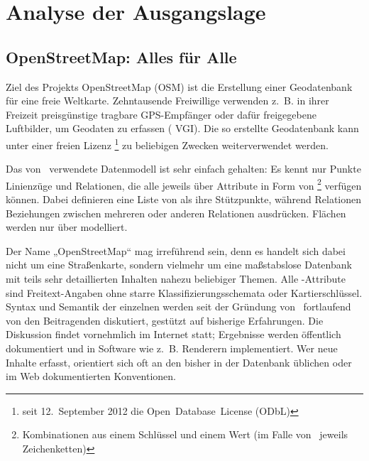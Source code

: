 \documentclass[../main/thesis.tex]{subfiles}
\begin{document}
\chapter{Analyse der Ausgangslage}

\section{OpenStreetMap: Alles für Alle}
\label{ch:osm-intro}

Ziel des Projekts OpenStreetMap (OSM) ist die Erstellung einer Geodatenbank für eine freie Weltkarte. 
Zehntausende Freiwillige verwenden z.~B. in ihrer Freizeit preisgünstige tragbare GPS-Empfänger oder dafür freigegebene Luftbilder, um Geodaten zu erfassen ( VGI). 
Die so erstellte Geodatenbank kann unter einer freien Lizenz%
\footnote{seit 12.~September 2012 die Open~Database~License (ODbL) }
zu beliebigen Zwecken weiterverwendet werden. 


Das von \osm\ verwendete Datenmodell ist sehr einfach gehalten:
Es kennt nur Punkte  Linienzüge  und Relationen, die alle jeweils über Attribute  in Form von %
\footnote{Kombinationen aus einem Schlüssel und einem Wert (im Falle von \osm\ jeweils Zeichenketten) }
verfügen können.
Dabei definieren  eine Liste von  als ihre Stützpunkte, während Relationen Beziehungen zwischen mehreren   oder anderen Relationen ausdrücken.
Flächen werden nur über  modelliert.

Der Name „OpenStreetMap“ mag irreführend sein, denn es handelt sich dabei nicht um eine Straßenkarte, sondern vielmehr um eine maßstabslose Datenbank mit teils sehr detaillierten Inhalten nahezu beliebiger Themen. 
Alle \osm-Attribute sind Freitext-Angaben ohne starre Klassifizierungsschemata oder Kartierschlüssel.
Syntax und Semantik der einzelnen  werden seit der Gründung von \osm\ fortlaufend von den Beitragenden diskutiert, gestützt auf bisherige Erfahrungen.
Die Diskussion findet vornehmlich im Internet statt; Ergebnisse werden öffentlich dokumentiert und in Software wie z.~B. Renderern implementiert.
Wer neue Inhalte erfasst, orientiert sich oft an den bisher in der Datenbank üblichen oder im Web dokumentierten Konventionen. 
\end{document}

